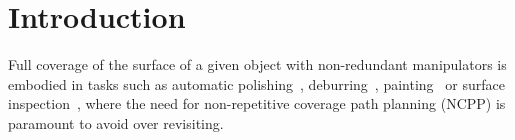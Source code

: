 \documentclass[Afour,sageh,times]{sagej}
\begin{document}

\maketitle

\section{Introduction}
Full coverage of the surface of a given object with non-redundant manipulators is embodied in tasks such as automatic polishing~\cite{Tian2016Polishing}, deburring~\cite{Xie2016Grinding}, painting~\cite{Li2011Painting} or surface inspection~\cite{Molina2017Defects}, where the need for non-repetitive coverage path planning (NCPP) is paramount to avoid over revisiting. 
\end{document}
